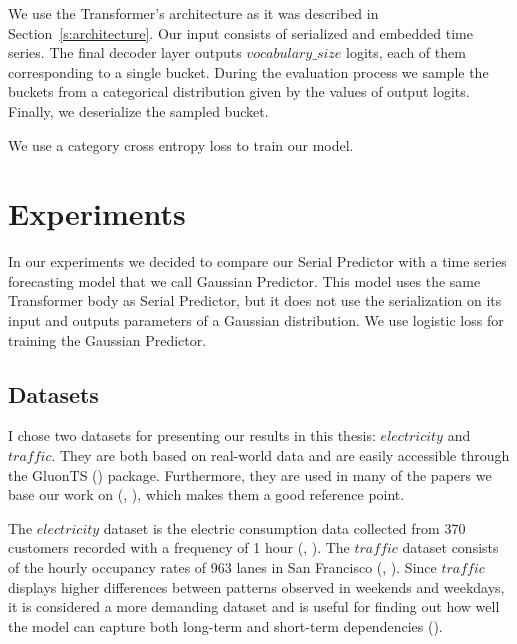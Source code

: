 \documentclass[en]{pracamgr}
\begin{document}
We use the Transformer's architecture as it was described in Section~\ref{s:architecture}. Our input consists of serialized and embedded time series. The final decoder layer outputs $vocabulary\_size$ logits, each of them corresponding to a single bucket. During the evaluation process we sample the buckets from a categorical distribution given by the values of output logits. Finally, we deserialize the sampled bucket.

We use a category cross entropy loss to train our model.







\chapter{Experiments}

In our experiments we decided to compare our Serial Predictor with a time series forecasting model that we call Gaussian Predictor. This model uses the same Transformer body as Serial Predictor, but it does not use the serialization on its input and outputs parameters of a Gaussian distribution. We use logistic loss for training the Gaussian Predictor.

\section{Datasets}

I chose two datasets for presenting our results in this thesis: $electricity$ and $traffic$. They are both based on real-world data and are easily accessible through the GluonTS (\cite{gluonts}) package. Furthermore, they are used in many of the papers we base our work on (\cite{enhancing}, \cite{deepar}), which makes them a good reference point.

The $electricity$ dataset is the electric consumption data collected from 370 customers recorded with a frequency of 1 hour (\cite{enhancing}, \cite{deepar}). The $traffic$ dataset consists of the hourly occupancy rates of 963 lanes in San Francisco (\cite{enhancing}, \cite{deepar}). Since $traffic$ displays higher differences between patterns observed in weekends and weekdays, it is considered a more demanding dataset and is useful for finding out how well the model can capture both long-term and short-term dependencies (\cite{enhancing}).
\end{document}
